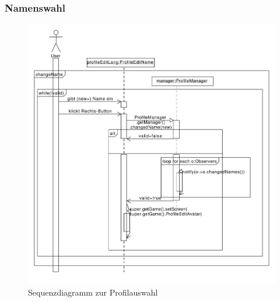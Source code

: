 \subsubsection{Namenswahl}
\begin{figure}[H]
\centering
\includegraphics[scale=0.60]{./sections/sequence_diagrams/profile_scenarios/ProfileNamenswahl.pdf}
\caption{Sequenzdiagramm zur Profilauswahl}
\end{figure}

